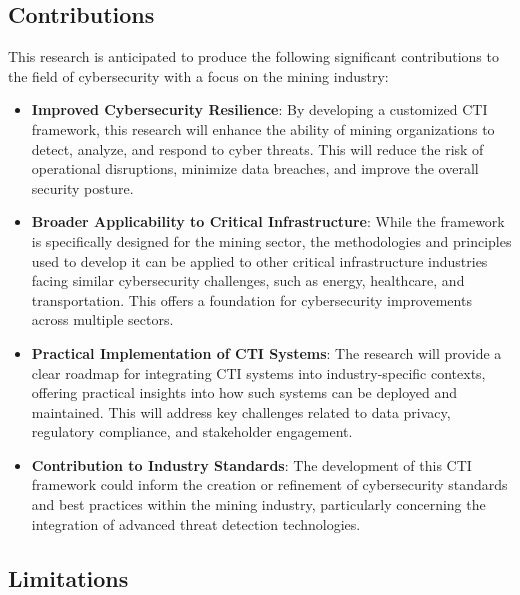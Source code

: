 \documentclass[a4paper,twoside,12pt]{report}
\begin{document}
\subsection{Contributions}
This research is anticipated to produce the following significant contributions to the field of cybersecurity with a focus on the mining industry:
\begin{itemize}
    \item \textbf{Improved Cybersecurity Resilience}: By developing a customized CTI framework, this research will enhance the ability of mining organizations to detect, analyze, and respond to cyber threats. This will reduce the risk of operational disruptions, minimize data breaches, and improve the overall security posture.
    
    \item \textbf{Broader Applicability to Critical Infrastructure}: While the framework is specifically designed for the mining sector, the methodologies and principles used to develop it can be applied to other critical infrastructure industries facing similar cybersecurity challenges, such as energy, healthcare, and transportation. This offers a foundation for cybersecurity improvements across multiple sectors.
    
    \item \textbf{Practical Implementation of CTI Systems}: The research will provide a clear roadmap for integrating CTI systems into industry-specific contexts, offering practical insights into how such systems can be deployed and maintained. This will address key challenges related to data privacy, regulatory compliance, and stakeholder engagement.
    
    \item \textbf{Contribution to Industry Standards}: The development of this CTI framework could inform the creation or refinement of cybersecurity standards and best practices within the mining industry, particularly concerning the integration of advanced threat detection technologies.
\end{itemize}


\subsection{Limitations}
\end{document}
